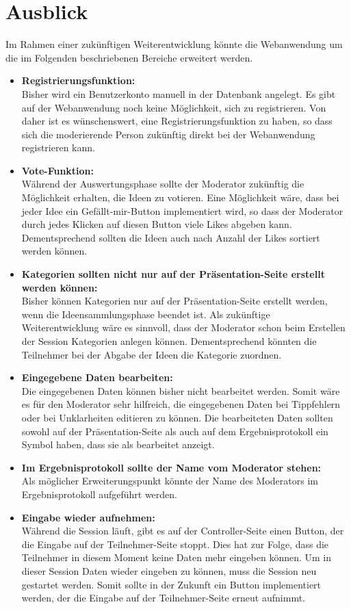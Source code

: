 \section{Ausblick}
\label{sec:Ausblick}
Im Rahmen einer zukünftigen Weiterentwicklung könnte die Webanwendung um die im Folgenden beschriebenen Bereiche erweitert werden.

\begin{itemize}
\item \textbf{Registrierungsfunktion:}\\
Bisher wird ein Benutzerkonto manuell in der Datenbank angelegt. Es gibt auf der Webanwendung noch keine Möglichkeit, sich zu registrieren. Von daher ist es wünschenswert, eine Registrierungsfunktion zu haben, so dass sich die moderierende Person zukünftig direkt bei der Webanwendung registrieren kann.
\item \textbf{Vote-Funktion:}\\
Während der Auswertungsphase sollte der Moderator zukünftig die Möglichkeit erhalten, die Ideen zu votieren. Eine Möglichkeit wäre, dass bei jeder Idee ein Gefällt-mir-Button implementiert wird, so dass der Moderator durch jedes Klicken auf diesen Button viele Likes abgeben kann. Dementsprechend sollten die Ideen auch nach Anzahl der Likes sortiert werden können.
\item \textbf{Kategorien sollten nicht nur auf der Präsentation-Seite erstellt werden können:}\\
Bisher können Kategorien nur auf der Präsentation-Seite erstellt werden, wenn die Ideensammlungsphase beendet ist. Als zukünftige Weiterentwicklung wäre es sinnvoll, dass der Moderator schon beim Erstellen der Session Kategorien anlegen können. Dementsprechend könnten die Teilnehmer bei der Abgabe der Ideen die Kategorie zuordnen. 
\item \textbf{Eingegebene Daten bearbeiten:}\\
Die eingegebenen Daten können bisher nicht bearbeitet werden. Somit wäre es für den Moderator sehr hilfreich, die eingegebenen Daten bei Tippfehlern oder bei Unklarheiten editieren zu können. Die bearbeiteten Daten sollten sowohl auf der Präsentation-Seite als auch auf dem Ergebnisprotokoll ein Symbol haben, dass sie als bearbeitet anzeigt.
\item \textbf{Im Ergebnisprotokoll sollte der Name vom Moderator stehen:}\\
Als möglicher Erweiterungspunkt könnte der Name des Moderators im Ergebnisprotokoll aufgeführt werden.
\item \textbf{Eingabe wieder aufnehmen:}\\
Während die Session läuft, gibt es auf der Controller-Seite einen Button, der die Eingabe auf der Teilnehmer-Seite stoppt. Dies hat zur Folge, dass die Teilnehmer in diesem Moment keine Daten mehr eingeben können. Um in dieser Session Daten wieder eingeben zu können, muss die Session neu gestartet werden. Somit sollte in der Zukunft ein Button implementiert werden, der die Eingabe auf der Teilnehmer-Seite erneut aufnimmt.
\end{itemize}
